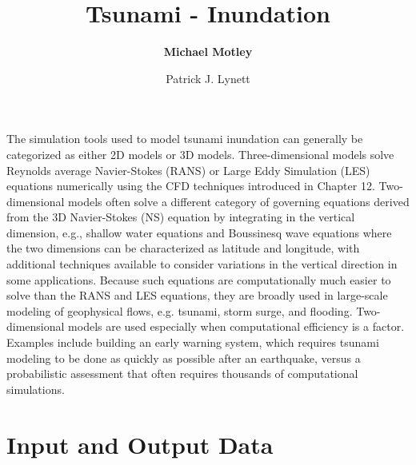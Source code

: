 %
%
%


\title{Tsunami - Inundation}
\author{
    \textbf{Michael Motley} 
    \and Patrick J. Lynett}
\tocauthor{}
%
%
\maketitle

The simulation tools used to model tsunami inundation can generally be categorized as either 2D models or 3D models. Three-dimensional models solve Reynolds average Navier-Stokes (RANS) or Large Eddy Simulation (LES) equations numerically using the CFD techniques introduced in Chapter 12. Two-dimensional models often solve a different category of governing equations derived from the 3D Navier-Stokes (NS) equation by integrating in the vertical dimension, e.g., shallow water equations and Boussinesq wave equations where the two dimensions can be characterized as latitude and longitude, with additional techniques available to consider variations in the vertical direction in some applications. Because such equations are computationally much easier to solve than the RANS and LES equations, they are broadly used in large-scale modeling of geophysical flows, e.g. tsunami, storm surge, and flooding. Two-dimensional models are used especially when computational efficiency is a factor. Examples include building an early warning system, which requires tsunami modeling to be done as quickly as possible after an earthquake, versus a probabilistic assessment that often requires thousands of computational simulations.

\section{Input and Output Data}
\label{sec:tsunami_io}

